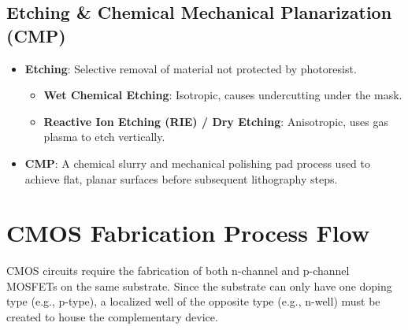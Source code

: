 \documentclass[12pt,a4paper]{article}
\begin{document}
\subsection{Etching \& Chemical Mechanical Planarization (CMP)}
\begin{itemize}[leftmargin=*, itemsep=3.5pt]
  \item \textbf{Etching}: Selective removal of material not protected by photoresist.
  \begin{itemize}[leftmargin=*, noitemsep, topsep=2pt]
    \item \textbf{Wet Chemical Etching}: Isotropic, causes undercutting under the mask.
    \item \textbf{Reactive Ion Etching (RIE) / Dry Etching}: Anisotropic, uses gas plasma to etch vertically.
  \end{itemize}
  \item \textbf{CMP}: A chemical slurry and mechanical polishing pad process used to achieve flat, planar surfaces before subsequent lithography steps.
\end{itemize}

\section{CMOS Fabrication Process Flow}

CMOS circuits require the fabrication of both n-channel and p-channel MOSFETs on the same substrate. Since the substrate can only have one doping type (e.g., p-type), a localized well of the opposite type (e.g., n-well) must be created to house the complementary device.
\end{document}
